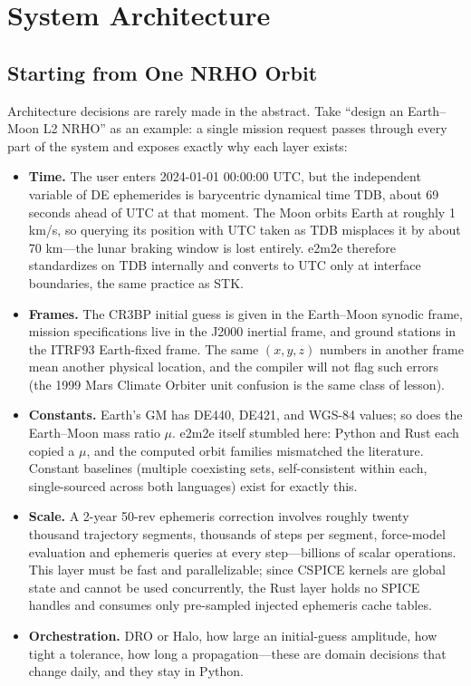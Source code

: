 \section{System Architecture}
\label{sec:architecture}

\subsection{Starting from One NRHO Orbit}

Architecture decisions are rarely made in the abstract. Take ``design an
Earth--Moon L2 NRHO'' as an example: a single mission request passes through
every part of the system and exposes exactly why each layer exists:

\begin{itemize}
  \item \textbf{Time.} The user enters 2024-01-01 00:00:00 UTC, but the
        independent variable of DE ephemerides is barycentric dynamical time
        TDB, about 69 seconds ahead of UTC at that moment. The Moon orbits
        Earth at roughly 1 km/s, so querying its position with UTC taken as
        TDB misplaces it by about 70 km---the lunar braking window is lost
        entirely. e2m2e therefore standardizes on TDB internally and converts
        to UTC only at interface boundaries, the same practice as STK.
  \item \textbf{Frames.} The CR3BP initial guess is given in the Earth--Moon
        synodic frame, mission specifications live in the J2000 inertial
        frame, and ground stations in the ITRF93 Earth-fixed frame. The same
        $(x,y,z)$ numbers in another frame mean another physical location,
        and the compiler will not flag such errors (the 1999 Mars Climate
        Orbiter unit confusion is the same class of lesson).
  \item \textbf{Constants.} Earth's GM has DE440, DE421, and WGS-84 values;
        so does the Earth--Moon mass ratio $\mu$. e2m2e itself stumbled here:
        Python and Rust each copied a $\mu$, and the computed orbit families
        mismatched the literature. Constant baselines (multiple coexisting
        sets, self-consistent within each, single-sourced across both
        languages) exist for exactly this.
  \item \textbf{Scale.} A 2-year 50-rev ephemeris correction involves
        roughly twenty thousand trajectory segments, thousands of steps per
        segment, force-model evaluation and ephemeris queries at every
        step---billions of scalar operations. This layer must be fast and
        parallelizable; since CSPICE kernels are global state and cannot be
        used concurrently, the Rust layer holds no SPICE handles and consumes
        only pre-sampled injected ephemeris cache tables.
  \item \textbf{Orchestration.} DRO or Halo, how large an initial-guess
        amplitude, how tight a tolerance, how long a propagation---these are
        domain decisions that change daily, and they stay in Python.
\end{itemize}

